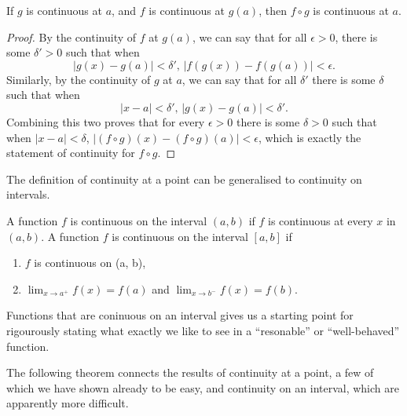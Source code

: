 \begin{theorem} \label {contcomp}
If $g$ is continuous at $a$, and $f$ is continuous at $g(a)$, then $f \circ g$ is continuous at $a$.

\begin{proof}
By the continuity of $f$ at $g(a)$, we can say that for all $\epsilon > 0$, there is some $\delta ' > 0$ such that when
\[ |g(x) - g(a)| < \delta ' \textrm{, } |f(g(x)) - f(g(a))| < \epsilon. \]
Similarly, by the continuity of $g$ at $a$, we can say that for all $\delta '$ there is some $\delta$ such that when
\[ |x - a| < \delta ' \textrm{, } |g(x) - g(a)| < \delta '. \]
Combining this two proves that for every $\epsilon > 0$ there is some $\delta > 0$ such that when $|x - a| < \delta$, $|(f \circ g)(x) - (f \circ g)(a)| < \epsilon$, which is exactly the statement of continuity for $f \circ g$.
\end{proof}
\end{theorem}

The definition of continuity at a point can be generalised to continuity on intervals.

\begin{definition}
A function $f$ is continuous on the interval $(a, b)$ if $f$ is continuous at every $x$ in $(a, b)$. A function $f$ is continuous on the interval $[a, b]$ if
\begin{enumerate}
\item
$f$ is continuous on (a, b),
\item
$\lim_{x \to a^+} f(x) = f(a)$ and $\lim_{x \to b^-} f(x) = f(b)$.
\end{enumerate}

\begin{remark}
Functions that are coninuous on an interval gives us a starting point for rigourously stating what exactly we like to see in a ``resonable'' or ``well-behaved'' function.
\end{remark}
\end{definition}

The following theorem connects the results of continuity at a point, a few of which we have shown already to be easy, and continuity on an interval, which are apparently more difficult.

